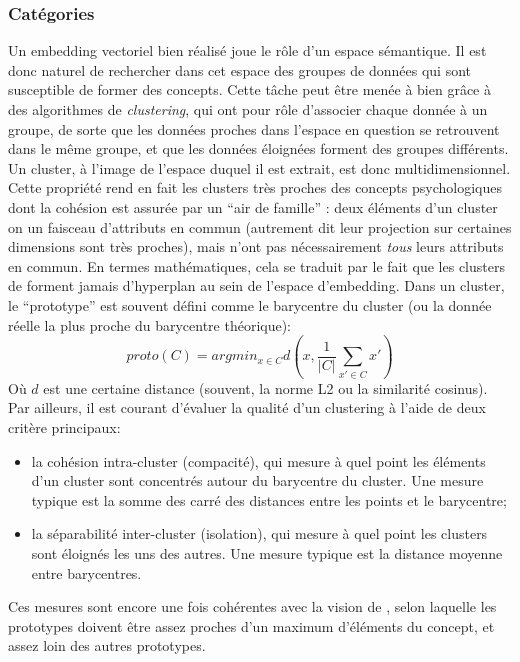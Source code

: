 \documentclass[french]{article}
\begin{document}
			\subsubsection{Catégories}
				Un embedding vectoriel bien réalisé joue le rôle d'un espace sémantique. Il est donc naturel de rechercher dans cet espace des groupes de données qui sont susceptible de former des concepts. Cette tâche peut être menée à bien grâce à des algorithmes de \textit{clustering}, qui ont pour rôle d'associer chaque donnée à un groupe, de sorte que les données proches dans l'espace en question se retrouvent dans le même groupe, et que les données éloignées forment des groupes différents. Un cluster, à l'image de l'espace duquel il est extrait, est donc multidimensionnel. Cette propriété rend en fait les clusters très proches des concepts psychologiques dont la cohésion est assurée par un ``air de famille'' : deux éléments d'un cluster on un faisceau d'attributs en commun (autrement dit leur projection sur certaines dimensions sont très proches), mais n'ont pas nécessairement \textit{tous} leurs attributs en commun. En termes mathématiques, cela se traduit par le fait que les clusters de forment jamais d'hyperplan au sein de l'espace d'embedding. Dans un cluster, le ``prototype'' est souvent défini comme le barycentre du cluster (ou la donnée réelle la plus proche du barycentre théorique):
				\begin{equation}
					proto(C) = argmin_{x \in C} d\left(x, \frac{1}{|C|}\sum_{x' \in C}x' \right)
				\end{equation}
				Où $d$ est une certaine distance (souvent, la norme L2 ou la similarité cosinus).\\
				
				Par ailleurs, il est courant d'évaluer la qualité d'un clustering à l'aide de deux critère principaux:
				\begin{itemize}
					\item la cohésion intra-cluster (compacité), qui mesure à quel point les éléments d'un cluster sont concentrés autour du barycentre du cluster. Une mesure typique est la somme des carré des distances entre les points et le barycentre;
					\item la séparabilité inter-cluster (isolation), qui mesure à quel point les clusters sont éloignés les uns des autres. Une mesure typique est la distance moyenne entre barycentres.
				\end{itemize}
				Ces mesures sont encore une fois cohérentes avec la vision de \cite{rosch1975}, selon laquelle les prototypes doivent être assez proches d'un maximum d'éléments du concept, et assez loin des autres prototypes.
			
\end{document}
